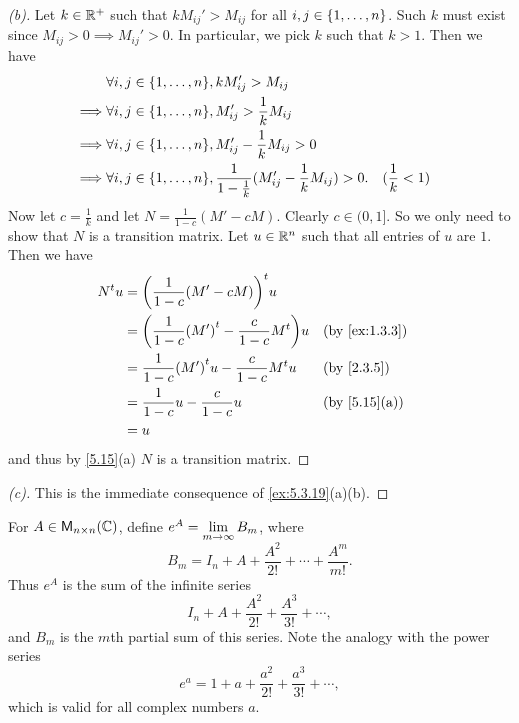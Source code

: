 \begin{proof}[(b)]
  Let \(k \in \mathbb{R}^+\) such that \(k M_{i j}' > M_{i j}\) for all \(i, j \in \left\lbrace1, \dots, n\right\rbrace\).
  Such \(k\) must exist since \(M_{i j} > 0 \implies M_{i j}' > 0\).
  In particular, we pick \(k\) such that \(k > 1\).
  Then we have
  \begin{align*}
             & \forall i, j \in \set{1, \dots, n}, k M_{i j}' > M_{i j}                                                                   \\
    \implies & \forall i, j \in \set{1, \dots, n}, M_{i j}' > \frac{1}{k} M_{i j}                                                         \\
    \implies & \forall i, j \in \set{1, \dots, n}, M_{i j}' - \frac{1}{k} M_{i j} > 0                                                     \\
    \implies & \forall i, j \in \set{1, \dots, n}, \frac{1}{1 - \frac{1}{k}} (M_{i j}' - \frac{1}{k} M_{i j}) > 0. &  & (\frac{1}{k} < 1)
  \end{align*}
  Now let \(c = \frac{1}{k}\) and let \(N = \frac{1}{1 - c} (M' - cM)\).
  Clearly \(c \in (0, 1]\).
  So we only need to show that \(N\) is a transition matrix.
  Let \(u \in \mathbb{R}^n\) such that all entries of \(u\) are \(1\).
  Then we have
  \begin{align*}
    \tp{N} u & = \tp{\pa{\frac{1}{1 - c} (M' - cM)}} u                                        \\
             & = \pa{\frac{1}{1 - c} \tp{(M')} - \frac{c}{1 - c} \tp{M}} u &  & \by{ex:1.3.3} \\
             & = \frac{1}{1 - c} \tp{(M')} u - \frac{c}{1 - c} \tp{M} u    &  & \by{2.3.5}    \\
             & = \frac{1}{1 - c} u - \frac{c}{1 - c} u                     &  & \by{5.15}[a]  \\
             & = u
  \end{align*}
  and thus by \cref{5.15}(a) \(N\) is a transition matrix.
\end{proof}

\begin{proof}[(c)]
  This is the immediate consequence of \cref{ex:5.3.19}(a)(b).
\end{proof}

\begin{defn}\label{5.3.18}
  For \(A \in \ms[n][n][\C]\), define \(e^A = \lim\limits_{m \to \infty} B_m\), where
  \[
    B_m = I_n + A + \frac{A^2}{2!} + \cdots + \frac{A^m}{m!}.
  \]
  Thus \(e^A\) is the sum of the infinite series
  \[
    I_n + A + \frac{A^2}{2!} + \frac{A^3}{3!} + \cdots,
  \]
  and \(B_m\) is the \(m\)th partial sum of this series.
  Note the analogy with the power series
  \[
    e^a = 1 + a + \frac{a^2}{2!} + \frac{a^3}{3!} + \cdots,
  \]
  which is valid for all complex numbers \(a\).
\end{defn}

